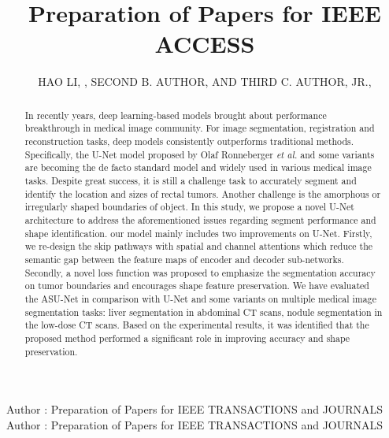 \documentclass{ieeeaccess}
\begin{document}

\title{Preparation of Papers for IEEE ACCESS}
\author{\uppercase{Hao Li}, ,
\uppercase{Second B. Author, and Third C. Author,
Jr}.,
}
\address[1]{Beijing University of chemical and technology, Beijing, 10029 China (e-mail: 2018040206@mail.buct.edu.cn)}
\address[2]{Department of Physics, Colorado State University, Fort Collins, 
CO 80523 USA (e-mail: author@lamar.colostate.edu)}
\address[3]{Electrical Engineering Department, University of Colorado, Boulder, CO 
80309 USA}

\markboth
{Author \headeretal: Preparation of Papers for IEEE TRANSACTIONS and JOURNALS}
{Author \headeretal: Preparation of Papers for IEEE TRANSACTIONS and JOURNALS}


\begin{abstract}
  In recently years, deep learning-based models brought about performance breakthrough  in medical image community. For image segmentation, registration and reconstruction tasks, deep models consistently outperforms traditional methods. Specifically, the U-Net model proposed by Olaf Ronneberger \emph{et al.}\cite{RonnebergerFB15} and some variants are becoming the de facto standard model and widely used in various medical image tasks. Despite great success, it is still a challenge task to accurately segment and identify the location and sizes of rectal tumors. Another challenge is the amorphous or irregularly shaped boundaries of object. In this study, we propose a novel U-Net architecture to address the aforementioned issues regarding segment performance and shape identification. our model mainly includes two improvements on U-Net. Firstly, we re-design the skip pathways with spatial and channel attentions which reduce the semantic gap between the feature maps of encoder and decoder sub-networks. Secondly, a novel loss function was proposed to emphasize the segmentation accuracy on tumor boundaries and encourages shape feature preservation. We have evaluated the ASU-Net in comparison with U-Net and some variants on multiple medical image segmentation tasks: liver segmentation in abdominal CT scans, nodule segmentation in the low-dose CT scans. Based on the experimental results, it was identified that the proposed method performed a significant role in improving accuracy and shape preservation.
  \end{abstract}
\end{document}
